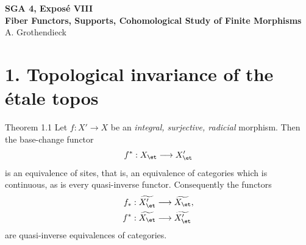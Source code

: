 
\begin{center}
{\Large \textbf{SGA 4, Expos\'e VIII}}\\[0.35em]
{\large \textbf{Fiber Functors, Supports, Cohomological Study of Finite Morphisms}}\\[0.25em]
{\normalsize A. Grothendieck}
\end{center}

\bigskip

\section*{1. Topological invariance of the \'etale topos}

\begin{statement}{Theorem 1.1}
Let \(f:X'\to X\) be an \emph{integral, surjective, radicial} morphism. Then the base-change functor
\[
f^*:X_{\et}\longrightarrow X'_{\et}
\]
is an equivalence of sites, that is, an equivalence of categories which is continuous, as is every quasi-inverse functor. Consequently the functors
\[
\begin{aligned}
f_*:\widetilde{X'_{\et}}&\longrightarrow \widetilde{X_{\et}},\\
f^*:\widetilde{X_{\et}}&\longrightarrow \widetilde{X'_{\et}}
\end{aligned}
\]
are quasi-inverse equivalences of categories.
\end{statement}

